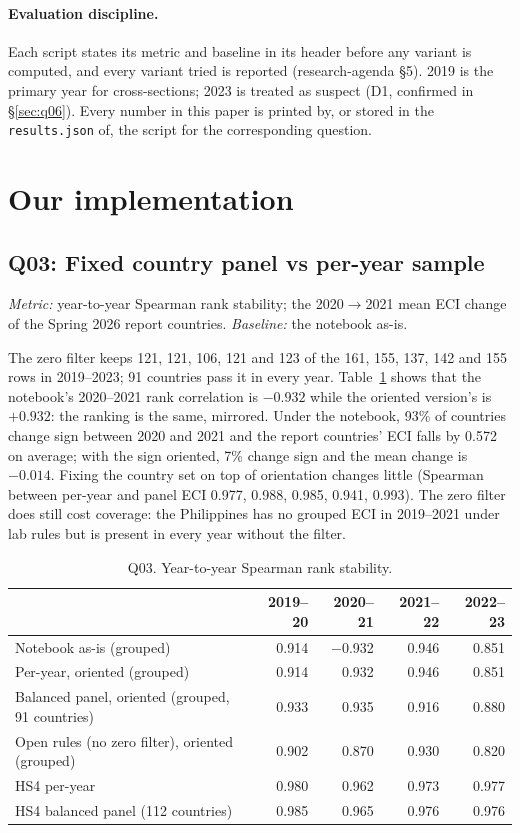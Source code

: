 \documentclass[11pt]{article}
\begin{document}
\paragraph{Evaluation discipline.} Each script states its metric and baseline in its header before any variant is computed, and every variant tried is reported (research-agenda \S5). 2019 is the primary year for cross-sections; 2023 is treated as suspect (D1, confirmed in \S\ref{sec:q06}). Every number in this paper is printed by, or stored in the \texttt{results.json} of, the script for the corresponding question.

\section{Our implementation}

\subsection{Q03: Fixed country panel vs per-year sample}\label{sec:q03}

\emph{Metric:} year-to-year Spearman rank stability; the 2020$\rightarrow$2021 mean ECI change of the Spring 2026 report countries. \emph{Baseline:} the notebook as-is.

The zero filter keeps 121, 121, 106, 121 and 123 of the 161, 155, 137, 142 and 155 rows in 2019--2023; 91 countries pass it in every year. Table~\ref{tab:q03} shows that the notebook's 2020--2021 rank correlation is $-0.932$ while the oriented version's is $+0.932$: the ranking is the same, mirrored. Under the notebook, 93\% of countries change sign between 2020 and 2021 and the report countries' ECI falls by 0.572 on average; with the sign oriented, 7\% change sign and the mean change is $-0.014$. Fixing the country set on top of orientation changes little (Spearman between per-year and panel ECI 0.977, 0.988, 0.985, 0.941, 0.993). The zero filter does still cost coverage: the Philippines has no grouped ECI in 2019--2021 under lab rules but is present in every year without the filter.

\begin{table}[H]\centering\small
\caption{Q03. Year-to-year Spearman rank stability.}\label{tab:q03}
\begin{tabular}{lrrrr}
\toprule
 & 2019--20 & 2020--21 & 2021--22 & 2022--23 \\
\midrule
Notebook as-is (grouped) & 0.914 & $-$0.932 & 0.946 & 0.851 \\
Per-year, oriented (grouped) & 0.914 & 0.932 & 0.946 & 0.851 \\
Balanced panel, oriented (grouped, 91 countries) & 0.933 & 0.935 & 0.916 & 0.880 \\
Open rules (no zero filter), oriented (grouped) & 0.902 & 0.870 & 0.930 & 0.820 \\
HS4 per-year & 0.980 & 0.962 & 0.973 & 0.977 \\
HS4 balanced panel (112 countries) & 0.985 & 0.965 & 0.976 & 0.976 \\
\bottomrule
\end{tabular}
\end{table}
\end{document}
